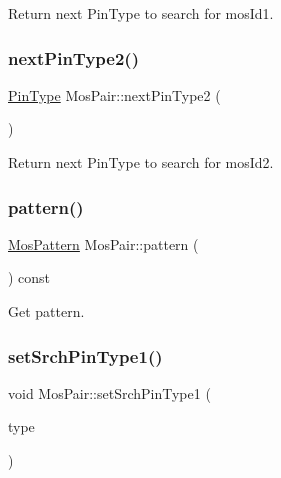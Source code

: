 Return next Pin\+Type to search for mos\+Id1. 

\mbox{\label{classMosPair_adc8c1ea8aff3b461f0d09652d1e730f8}} 
\subsubsection{\texorpdfstring{next\+Pin\+Type2()}{nextPinType2()}}
{\footnotesize\ttfamily \hyperlink{type_8h_afaab50027002ecbb6c8ac27e727d1bb4}{Pin\+Type} Mos\+Pair\+::next\+Pin\+Type2 (\begin{DoxyParamCaption}{ }\end{DoxyParamCaption})\hspace{0.3cm}{\ttfamily [inline]}}



Return next Pin\+Type to search for mos\+Id2. 

\mbox{\label{classMosPair_a342efc591b339fc9d08ad468d7399dd9}} 
\subsubsection{\texorpdfstring{pattern()}{pattern()}}
{\footnotesize\ttfamily \hyperlink{type_8h_af19eddb079bfea723256710b029c38e8}{Mos\+Pattern} Mos\+Pair\+::pattern (\begin{DoxyParamCaption}{ }\end{DoxyParamCaption}) const\hspace{0.3cm}{\ttfamily [inline]}}



Get pattern. 

\mbox{\label{classMosPair_a68fce010dca21d0834db83f8b8c0be0d}} 
\subsubsection{\texorpdfstring{set\+Srch\+Pin\+Type1()}{setSrchPinType1()}}
{\footnotesize\ttfamily void Mos\+Pair\+::set\+Srch\+Pin\+Type1 (\begin{DoxyParamCaption}\item[{\hyperlink{type_8h_afaab50027002ecbb6c8ac27e727d1bb4}{Pin\+Type}}]{type }\end{DoxyParamCaption})\hspace{0.3cm}{\ttfamily [inline]}}



